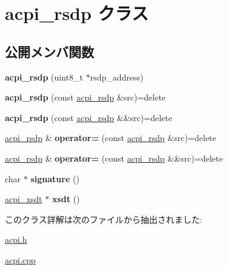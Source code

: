 \hypertarget{classacpi__rsdp}{}\section{acpi\+\_\+rsdp クラス}
\label{classacpi__rsdp}
\subsection*{公開メンバ関数}
\begin{DoxyCompactItemize}
\item 
\hypertarget{classacpi__rsdp_a1d261f44c3678f4986679e230b4b09c4}{}{\bfseries acpi\+\_\+rsdp} (uint8\+\_\+t $\ast$rsdp\+\_\+address)\label{classacpi__rsdp_a1d261f44c3678f4986679e230b4b09c4}

\item 
\hypertarget{classacpi__rsdp_a120265388dd84dbc6fb69ecb94d49eb1}{}{\bfseries acpi\+\_\+rsdp} (const \hyperlink{classacpi__rsdp}{acpi\+\_\+rsdp} \&src)=delete\label{classacpi__rsdp_a120265388dd84dbc6fb69ecb94d49eb1}

\item 
\hypertarget{classacpi__rsdp_a90d04a5ea31ef4a9c8c03dad7da1c87b}{}{\bfseries acpi\+\_\+rsdp} (const \hyperlink{classacpi__rsdp}{acpi\+\_\+rsdp} \&\&src)=delete\label{classacpi__rsdp_a90d04a5ea31ef4a9c8c03dad7da1c87b}

\item 
\hypertarget{classacpi__rsdp_a837f521b7a9ea61afaa32c0f65580a78}{}\hyperlink{classacpi__rsdp}{acpi\+\_\+rsdp} \& {\bfseries operator=} (const \hyperlink{classacpi__rsdp}{acpi\+\_\+rsdp} \&src)=delete\label{classacpi__rsdp_a837f521b7a9ea61afaa32c0f65580a78}

\item 
\hypertarget{classacpi__rsdp_a8ced51610f5b4769fc89e222a866bf5a}{}\hyperlink{classacpi__rsdp}{acpi\+\_\+rsdp} \& {\bfseries operator=} (const \hyperlink{classacpi__rsdp}{acpi\+\_\+rsdp} \&\&src)=delete\label{classacpi__rsdp_a8ced51610f5b4769fc89e222a866bf5a}

\item 
\hypertarget{classacpi__rsdp_a00665758ce838d3834c63fd0464e170f}{}char $\ast$ {\bfseries signature} ()\label{classacpi__rsdp_a00665758ce838d3834c63fd0464e170f}

\item 
\hypertarget{classacpi__rsdp_a466b4f6a7be1d7d6c20376bade914d2f}{}\hyperlink{classacpi__xsdt}{acpi\+\_\+xsdt} $\ast$ {\bfseries xsdt} ()\label{classacpi__rsdp_a466b4f6a7be1d7d6c20376bade914d2f}

\end{DoxyCompactItemize}


このクラス詳解は次のファイルから抽出されました\+:\begin{DoxyCompactItemize}
\item 
\hyperlink{acpi_8h}{acpi.\+h}\item 
\hyperlink{acpi_8cpp}{acpi.\+cpp}\end{DoxyCompactItemize}
